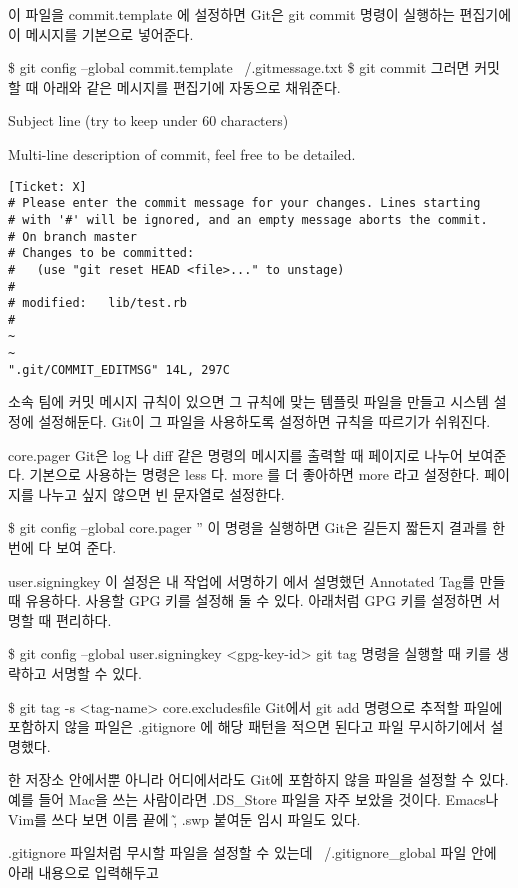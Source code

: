 \documentclass[12pt, a4paper, oneside]{book}
\begin{document}
이 파일을 commit.template 에 설정하면 Git은 git commit 명령이 실행하는 편집기에 이 메시지를 기본으로 넣어준다.

\$ git config --global commit.template ~/.gitmessage.txt
\$ git commit
그러면 커밋할 때 아래와 같은 메시지를 편집기에 자동으로 채워준다.

Subject line (try to keep under 60 characters)

Multi-line description of commit,
feel free to be detailed.


\begin{verbatim}
[Ticket: X]
# Please enter the commit message for your changes. Lines starting
# with '#' will be ignored, and an empty message aborts the commit.
# On branch master
# Changes to be committed:
#   (use "git reset HEAD <file>..." to unstage)
#
# modified:   lib/test.rb
#
~
~
".git/COMMIT_EDITMSG" 14L, 297C

\end{verbatim}

소속 팀에 커밋 메시지 규칙이 있으면 그 규칙에 맞는 템플릿 파일을 만들고 시스템 설정에 설정해둔다. Git이 그 파일을 사용하도록 설정하면 규칙을 따르기가 쉬워진다.

core.pager
Git은 log 나 diff 같은 명령의 메시지를 출력할 때 페이지로 나누어 보여준다. 기본으로 사용하는 명령은 less 다. more 를 더 좋아하면 more 라고 설정한다. 페이지를 나누고 싶지 않으면 빈 문자열로 설정한다.

\$ git config --global core.pager ''
이 명령을 실행하면 Git은 길든지 짧든지 결과를 한 번에 다 보여 준다.

user.signingkey
이 설정은 내 작업에 서명하기 에서 설명했던 Annotated Tag를 만들 때 유용하다. 사용할 GPG 키를 설정해 둘 수 있다. 아래처럼 GPG 키를 설정하면 서명할 때 편리하다.

\$ git config --global user.signingkey <gpg-key-id>
git tag 명령을 실행할 때 키를 생략하고 서명할 수 있다.

\$ git tag -s <tag-name>
core.excludesfile
Git에서 git add 명령으로 추적할 파일에 포함하지 않을 파일은 .gitignore 에 해당 패턴을 적으면 된다고 파일 무시하기에서 설명했다.

한 저장소 안에서뿐 아니라 어디에서라도 Git에 포함하지 않을 파일을 설정할 수 있다. 
예를 들어 Mac을 쓰는 사람이라면 .DS\_Store 파일을 자주 보았을 것이다. 
Emacs나 Vim를 쓰다 보면 이름 끝에 \~, .swp 붙여둔 임시 파일도 있다.

.gitignore 파일처럼 무시할 파일을 설정할 수 있는데 ~/.gitignore\_global 파일 안에 아래 내용으로 입력해두고
\end{document}
